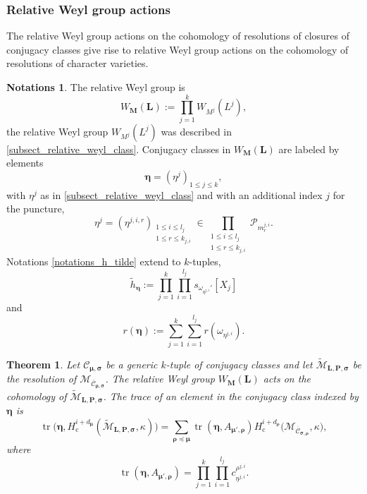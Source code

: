\documentclass[JEP,XML,SOM,NoEqCountersInSection,Unicode,published]{cedram}
\newcommand{\rc}{\mathrm{c}}
\theoremstyle{definition}
\newtheorem{notations}[definition]{Notations}
\theoremstyle{plain}
\newtheorem{theorem}[definition]{Theorem}
\DeclareMathOperator{\tr}{tr}
\newcommand{\Part}{\mathcal{P}}
\newcommand{\mlps}{\widetilde{\mathcal{M}}_{\boldsymbol{L},\boldsymbol{P},\boldsymbol{\sigma}}}
\begin{document}
\subsubsection{Relative Weyl group actions}\label{subsect_relative_weyl_char}

The relative Weyl group actions on the cohomology of resolutions of closures of conjugacy classes give rise to relative Weyl group actions on the cohomology of resolutions of character varieties.

\begin{notations}\label{notations_k_h_tilde}
The relative Weyl group is
\[
W_{\boldsymbol{M}}\left(\boldsymbol{L}\right):=\prod_{j=1}^k W_{M^j}(L^j),
\]
the relative Weyl group $W_{M^j}(L^j)$ was described in \ref{subsect_relative_weyl_class}.
Conjugacy classes in $W_{\boldsymbol{M}}(\boldsymbol{L})$ are labeled by elements
\[
\boldsymbol{\eta} = (\eta^j)_{1\le j\le k},
\]
with $\eta^j $
as in \ref{subsect_relative_weyl_class} and with an additional index $j$ for the puncture,
\[
\eta^j =(\eta^{j,i,r})_{\substack{ 1 \le i \le l_j\\ 1 \le r \le k_{j,i}}} \in \prod_{\substack{ 1 \le i \le l_j \\ 1 \le r \le k_{j,i}}} \Part_{m^{j,i}_{r}}.
\]
Notations \ref{notations_h_tilde} extend to $k$-tuples,
\[
\widetilde{h}_{\boldsymbol{\eta}}:=\prod_{j=1}^k\prod_{i=1}^{l_j} s_{ {\omega_{\eta^{j,i}}}' }\left[ X_j\right]
\]
and
\[
r(\boldsymbol{\eta}):=\sum_{j=1}^k\sum_{i=1}^{l_j} r(\omega_{\eta^{j,i}}).
\]
\end{notations}

\begin{theorem}\label{th_tr_resol}
Let $\mathcal{C}_{\boldsymbol{\mu},\boldsymbol{\sigma}}$ be a generic $k$-tuple of conjugacy classes and let $\mlps$ be the resolution of $\mathcal{M}_{\overline{\mathcal{C}}_{\boldsymbol{\mu},\boldsymbol{\sigma}}}$. The relative Weyl group $W_{\boldsymbol{M}}(\boldsymbol{L})$ acts on the cohomology of $\mlps$. The trace of an element in the conjugacy class indexed by $\boldsymbol{\eta}$ is
\[
\tr\bigl(\boldsymbol{\eta}, H_\rc^{i+d_{\boldsymbol{\mu}}}(\mlps,\kappa)\bigr) = \sum_{\boldsymbol{\rho\preceq \mu}} \tr\left(\boldsymbol{\eta}, A_{\boldsymbol{\mu'},\boldsymbol{\rho}}\right) H_\rc^{i+d_{\boldsymbol{\rho}}}\bigl(\mathcal{M}_{\overline{\boldsymbol{\mathcal{C}}}_{\boldsymbol{\sigma},\boldsymbol{\rho}}},\kappa\bigr),
\]
where
\[
\tr\left(\boldsymbol{\eta}, A_{\boldsymbol{\mu'},\boldsymbol{\rho}}\right) = \prod_{j=1}^k\prod_{i=1}^{l_j} c^{\rho^{j,i}}_{\eta^{j,i}}.
\]
\end{theorem}
\end{document}
